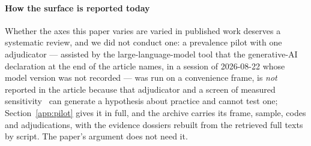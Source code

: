 \paragraph{How the surface is reported today}
\label{sec:practice}
Whether the axes this paper varies are varied in published work deserves a
systematic review, and we did not conduct one: a prevalence pilot with one
adjudicator --- assisted by the large-language-model tool that the
generative-AI declaration at the end of the article names, in a session of
2026-08-22 whose model version was not recorded --- was run on a
convenience frame, is \emph{not}
reported in the article because that adjudicator and a screen of measured
sensitivity \auditSens\ can generate a hypothesis about practice and cannot
test one; Section~\ref{app:pilot} gives it in full, and the archive carries its
frame, sample, codes and adjudications, with the evidence dossiers rebuilt
from the retrieved full texts by script. The paper's argument does not need
it.